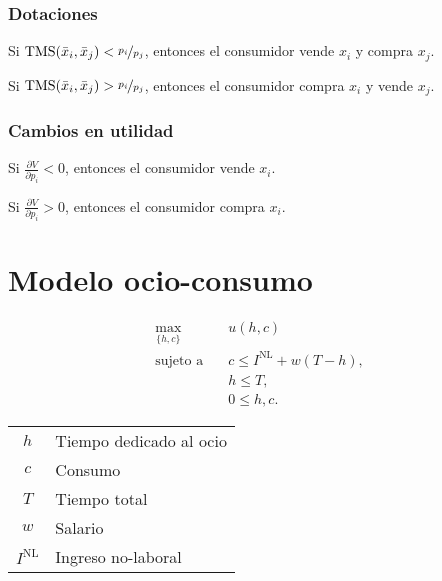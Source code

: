 \documentclass[8pt,a4paper]{extarticle}
\begin{document}
\begin{multicols}{3}
\subsubsection*{Dotaciones}

\begin{eqlist}
\item Si $\text{TMS} (\bar{x}_i, \bar{x}_j) < \nicefrac{p_i}{p_j}$, entonces el consumidor vende $x_i$ y compra $x_j$.
\item Si $\text{TMS} (\bar{x}_i, \bar{x}_j) > \nicefrac{p_i}{p_j}$, entonces el consumidor compra $x_i$ y vende $x_j$.
\end{eqlist}

\subsubsection*{Cambios en utilidad}

\begin{eqlist}
\item Si $\displaystyle \frac{\partial V}{\partial p_i} < 0$, entonces el consumidor vende $x_i$.
\item Si $\displaystyle \frac{\partial V}{\partial p_i} > 0$, entonces el consumidor compra $x_i$.
\end{eqlist}

\newpage

\section{Modelo ocio-consumo}

\begin{equation*}
\begin{aligned}
	\max_{\{h, c\}}\	  & u(h, c) \\
	\text{sujeto a} \quad & c \le I^{\text{NL}} + w(T - h), \\
						  & h \le T, \\
						  & 0 \le h, c.
\end{aligned}
\end{equation*}

\begin{center}
\begin{tabular}{ c l }
	\hline
	$h$ & Tiempo dedicado al ocio \\
	$c$ & Consumo \\
	$T$ & Tiempo total \\
	$w$ & Salario \\
	$I^{\text{NL}}$ & Ingreso no-laboral \\
	\hline
\end{tabular}
\end{center}


\end{multicols}
\end{document}
